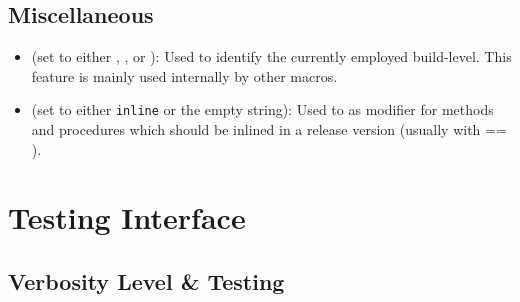 \subsection{Miscellaneous}
\label{sec:miscellaneous}

\begin{itemize}
\item \BuildLevel (set to either \ProLevel, \DebLevel, or \AudLevel):
  Used to identify the currently employed build-level. This feature is
  mainly used internally by other macros.
\item \Inline (set to either {\tt inline} or the empty string): Used
  to as modifier for methods and procedures which should be inlined in
  a release version (usually with \BuildLevel == \ProLevel).
\end{itemize}






\section{Testing Interface}
\label{sec:testing-interface}



\subsection{Verbosity Level \& Testing}
\label{sec:verbosity-level-}



